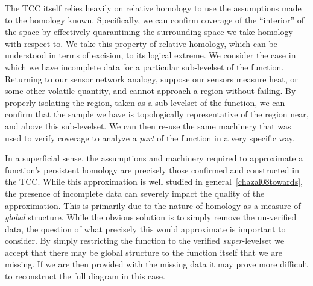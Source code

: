 The TCC itself relies heavily on relative homology to use the assumptions made to the homology known.
Specifically, we can confirm coverage of the ``interior'' of the space by effectively quarantining the surrounding space we take homology with respect to.
We take this property of relative homology, which can be understood in terms of excision, to its logical extreme.
We consider the case in which we have incomplete data for a particular sub-levelset of the function.
Returning to our sensor network analogy, suppose our sensors measure heat, or some other volatile quantity, and cannot approach a region without failing.
By properly isolating the region, taken as a sub-levelset of the function, we can confirm that the sample we have is topologically representative of the region near, and above this sub-levelset.
We can then re-use the same machinery that was used to verify coverage to analyze a \emph{part} of the function in a very specific way.

In a superficial sense, the assumptions and machinery required to approximate a function's persistent homology are precisely those confirmed and constructed in the TCC. %
While this approximation is well studied in general~\ref{chazal08towards}, the presence of incomplete data can severely impact the quality of the approximation.
This is primarily due to the nature of homology as a measure of \emph{global} structure.
While the obvious solution is to simply remove the un-verified data, the question of what precisely this would approximate is important to consider.
By simply restricting the function to the verified \emph{super}-levelset we accept that there may be global structure to the function itself that we are missing.
If we are then provided with the missing data it may prove more difficult to reconstruct the full diagram in this case.


